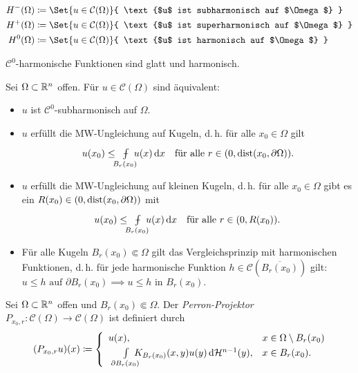 \documentclass{cheat-sheet}
\newcommand{\HM}{\mathcal{H}} %
\newcommand{\dist}{\mathrm{dist}} %
\def\Xint#1{\mathchoice
   {\XXint\displaystyle\textstyle{#1}}%
   {\XXint\textstyle\scriptstyle{#1}}%
   {\XXint\scriptstyle\scriptscriptstyle{#1}}%
   {\XXint\scriptscriptstyle\scriptscriptstyle{#1}}%
   \!\int}
\def\XXint#1#2#3{{\setbox0=\hbox{$#1{#2#3}{\int}$}
     \vcenter{\hbox{$#2#3$}}\kern-.5\wd0}}
\def\dashint{\Xint-}
\newcommand{\mymvint}[2]{{\textstyle \dashint\limits_{#1}^{#2}}}
\newcommand{\MVInt}[4]{\mymvint{#1}{#2} #3 \,\d #4}
\begin{document}
\begin{nota}
  \begin{minipage}[t]{0.8 \linewidth}
    \vspace{-15pt}
    \begin{align*}
      H^-(\Omega) &\coloneqq \Set{u \in \mathcal{C}(\Omega)}{ \text{$u$ ist subharmonisch auf $\Omega$} }\\
      H^+(\Omega) &\coloneqq \Set{u \in \mathcal{C}(\Omega)}{ \text{$u$ ist superharmonisch auf $\Omega$} }\\
      H^0(\Omega) &\coloneqq \Set{u \in \mathcal{C}(\Omega)}{ \text{$u$ ist harmonisch auf $\Omega$} }
    \end{align*}
  \end{minipage}
\end{nota}

\begin{bem}
  $\mathcal{C}^0$-harmonische Funktionen sind glatt und harmonisch.
\end{bem}

\begin{lem}
  Sei $\Omega \subset \mathbb{R}^n$ offen. Für $u \in \mathcal{C}(\Omega)$ sind äquivalent:
  \begin{itemize}
    \item $u$ ist $\mathcal{C}^0$-subharmonisch auf $\Omega$.
    \item $u$ erfüllt die MW-Ungleichung auf Kugeln, d.\,h. für alle $x_0 \in \Omega$ gilt
    \[
      u(x_0) \leq \enspace\MVInt{\mathclap{B_r(x_0)}}{}{\enspace u(x)}{x} \quad
      \text{für alle $r \in \ointerval{0}{\dist(x_0, \partial \Omega)}$.}
    \]
    \item $u$ erfüllt die MW-Ungleichung auf kleinen Kugeln, d.\,h. für alle $x_0 \in \Omega$ gibt es ein $R(x_0) \in \ointerval{0}{\dist(x_0, \partial \Omega)}$ mit
    \[
      u(x_0) \leq \enspace\MVInt{\mathclap{B_r(x_0)}}{}{\enspace u(x)}{x} \quad
      \text{für alle $r \in \ointerval{0}{R(x_0)}$.}
    \]
    \item Für alle Kugeln $B_r(x_0) \Subset \Omega$ gilt das Vergleichsprinzip mit harmonischen Funktionen, d.\,h. für jede harmonische Funktion $h \in \mathcal{C}(\overline{B_r(x_0)})$ gilt: $u \leq h \text{ auf $\partial B_r(x_0)$} \implies u \leq h \text{ in $B_r(x_0)$.}$
  \end{itemize}
\end{lem}

\begin{defn}
  Sei $\Omega \subset \mathbb{R}^n$ offen und $B_r(x_0) \Subset \Omega$. Der \emph{Perron-Projektor} $P_{x_0,r} : \mathcal{C}(\Omega) \to \mathcal{C}(\Omega)$ ist definiert durch
  \[
    (P_{x_0,r} u)(x) \coloneqq \begin{cases}
      \enspace u(x), & x \in \Omega \setminus B_r(x_0)\\
      \qquad \Int{\mathclap{\partial B_r(x_0)}}{}{\enspace K_{B_r(x_0)}(x,y) u(y)}{\HM^{n-1}(y)}, & x \in B_r(x_0).
    \end{cases}
  \]
\end{defn}
\end{document}
